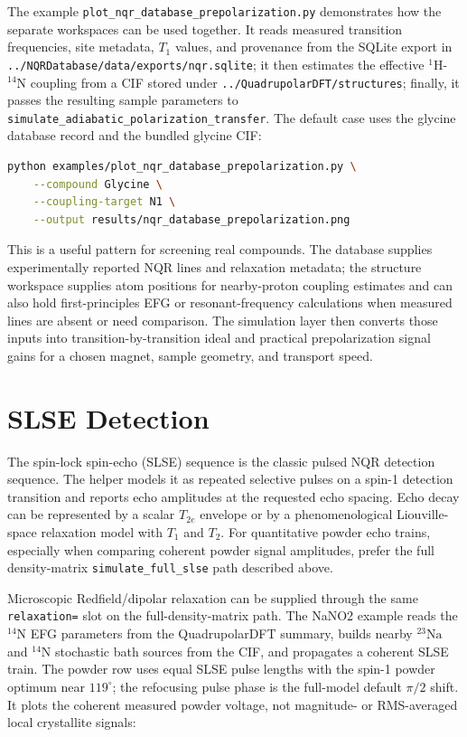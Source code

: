 \documentclass[11pt,oneside]{report}
\newcommand{\code}[1]{\texttt{#1}}
\begin{document}
The example \code{plot\_nqr\_database\_prepolarization.py} demonstrates how the
separate workspaces can be used together. It reads measured transition
frequencies, site metadata, \(T_1\) values, and provenance from the SQLite
export in \code{../NQRDatabase/data/exports/nqr.sqlite}; it then estimates the
effective \({}^{1}\mathrm{H}\)-\({}^{14}\mathrm{N}\) coupling from a CIF stored
under \code{../QuadrupolarDFT/structures}; finally, it passes the resulting
sample parameters to
\code{simulate\_adiabatic\_polarization\_transfer}. The default case uses the
glycine database record and the bundled glycine CIF:

\begin{lstlisting}[language=bash]
python examples/plot_nqr_database_prepolarization.py \
    --compound Glycine \
    --coupling-target N1 \
    --output results/nqr_database_prepolarization.png
\end{lstlisting}

This is a useful pattern for screening real compounds. The database supplies
experimentally reported NQR lines and relaxation metadata; the structure
workspace supplies atom positions for nearby-proton coupling estimates and can
also hold first-principles EFG or resonant-frequency calculations when measured
lines are absent or need comparison. The simulation layer then converts those
inputs into transition-by-transition ideal and practical prepolarization signal
gains for a chosen magnet, sample geometry, and transport speed.

\section{SLSE Detection}

The spin-lock spin-echo (SLSE) sequence is the classic pulsed NQR detection
sequence. The helper models it as repeated selective pulses on a spin-1
detection transition and reports echo amplitudes at the requested echo spacing.
Echo decay can be represented by a scalar \(T_{2e}\) envelope or by a
phenomenological Liouville-space relaxation model with \(T_1\) and \(T_2\). For
quantitative powder echo trains, especially when comparing coherent powder
signal amplitudes, prefer the full density-matrix \code{simulate\_full\_slse}
path described above.

Microscopic Redfield/dipolar relaxation can be supplied through the same
\code{relaxation=} slot on the full-density-matrix path. The NaNO2 example reads
the \({}^{14}\mathrm{N}\) EFG parameters from the QuadrupolarDFT summary, builds
nearby \({}^{23}\mathrm{Na}\) and \({}^{14}\mathrm{N}\) stochastic bath sources
from the CIF, and propagates a coherent SLSE train. The powder row uses equal
SLSE pulse lengths with the spin-1 powder optimum near \(119^\circ\); the
refocusing pulse phase is the full-model default \(\pi/2\) shift. It plots the
coherent measured powder voltage, not magnitude- or RMS-averaged local
crystallite signals:
\end{document}

